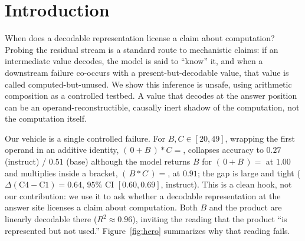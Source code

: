 \section{Introduction}

When does a decodable representation license a claim about computation? Probing the
residual stream is a standard route to mechanistic claims: if an intermediate value
decodes, the model is said to ``know'' it, and when a downstream failure co-occurs with a
present-but-decodable value, that value is called computed-but-unused. We show this
inference is unsafe, using arithmetic composition as a controlled testbed. A value that
decodes at the answer position can be an operand-reconstructible, causally inert shadow of
the computation, not the computation itself.

Our vehicle is a single controlled failure. For $B, C \in [20,49]$, wrapping the first operand
in an additive identity, $(\,0 + B\,) * C =$, collapses accuracy to $0.27$ (instruct) / $0.51$
(base) although the model returns $B$ for $(\,0 + B\,) =$ at $1.00$ and multiplies inside a
bracket, $(\,B * C\,) =$, at $0.91$; the gap is large and tight
($\Delta(\text{C4}{-}\text{C1}) = 0.64$, $95\%$ CI $[0.60, 0.69]$, instruct). This is a clean
hook, not our contribution: we use it to ask whether a decodable representation at the answer
site licenses a claim about computation. Both $B$ and the product \bc{} are linearly decodable
there ($R^2 \approx 0.96$), inviting the reading that the product ``is represented but not
used.'' Figure~\ref{fig:hero} summarizes why that reading fails.



